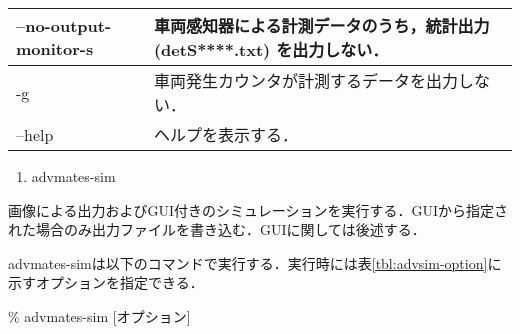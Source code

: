 \begin{table}[hbt]
\begin{center}
\begin{tabular}{|l|p{20em}|}
      --no-output-monitor-s
      & 車両感知器による計測データのうち，統計出力 (detS****.txt) を出力しない．\\ \hline
      
      -g
      & 車両発生カウンタが計測するデータを出力しない．\\ \hline
      
      --help
      & ヘルプを表示する．\\ \hline
      
    \end{tabular}
  \end{center}
  \label{tbl:advcalc-option}
\end{table}

\begin{enumerate}
  \setcounter{enumi}{\value{execnum}}
  \renewcommand{\labelenumi}{(\arabic{enumi})}
\item advmates-sim
  \setcounter{execnum}{\value{enumi}}
\end{enumerate}

画像による出力およびGUI付きのシミュレーションを実行する．GUIから指定された場合のみ出力ファイルを書き込む．GUIに関しては後述する．

advmates-simは以下のコマンドで実行する．実行時には表\ref{tbl:advsim-option}に示すオプションを指定できる．

\begin{screen}
  \% advmates-sim [オプション]
\end{screen}

